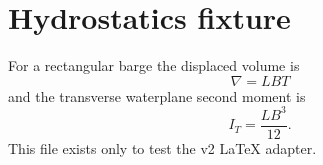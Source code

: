 \documentclass{article}
\begin{document}
\section*{Hydrostatics fixture}
For a rectangular barge the displaced volume is
\[
\nabla = LBT
\]
and the transverse waterplane second moment is
$$
I_T = \frac{LB^3}{12}.
$$
This file exists only to test the v2 LaTeX adapter.
\end{document}
